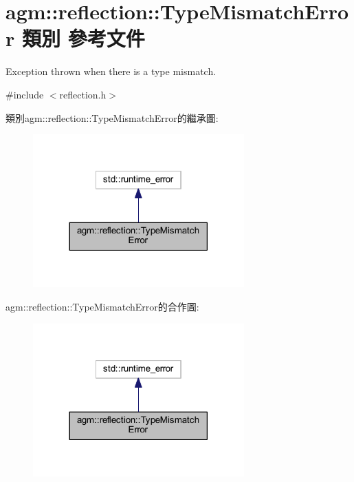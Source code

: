\hypertarget{classagm_1_1reflection_1_1_type_mismatch_error}{}\section{agm\+:\+:reflection\+:\+:Type\+Mismatch\+Error 類別 參考文件}
\label{classagm_1_1reflection_1_1_type_mismatch_error}


Exception thrown when there is a type mismatch.  




{\ttfamily \#include $<$reflection.\+h$>$}



類別agm\+:\+:reflection\+:\+:Type\+Mismatch\+Error的繼承圖\+:\nopagebreak
\begin{figure}[H]
\begin{center}
\leavevmode
\includegraphics[width=230pt]{classagm_1_1reflection_1_1_type_mismatch_error__inherit__graph}
\end{center}
\end{figure}


agm\+:\+:reflection\+:\+:Type\+Mismatch\+Error的合作圖\+:\nopagebreak
\begin{figure}[H]
\begin{center}
\leavevmode
\includegraphics[width=230pt]{classagm_1_1reflection_1_1_type_mismatch_error__coll__graph}
\end{center}
\end{figure}
